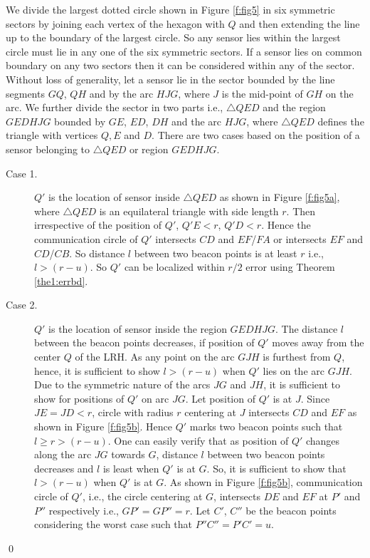 \documentclass[preprint,11pt]{elsarticle}
\newenvironment{proof}{\noindent{\bf Proof: }}{\qed \smallbreak}
\begin{document}
\begin{proof}
We divide the largest dotted circle shown in Figure \ref{f:fig5} in six symmetric sectors by
joining each vertex of the hexagon with $Q$ and then extending the line up to the boundary of the largest circle.
So any sensor lies within the largest circle must lie in any one of the six symmetric sectors. If a sensor lies
on common boundary on any two sectors then it can be considered within any of the sector.
Without loss of generality, let a sensor lie in the sector bounded by the line segments $GQ$, $QH$ and
by the arc $HJG$, where $J$ is the mid-point of $GH$ on the arc. We further divide the sector in two parts i.e., $\triangle QED$ and the region $GEDHJG$ bounded by $GE$, $ED$, $DH$ and the arc $HJG$, where $\triangle QED$ defines the triangle with vertices $Q, E$ and $D$. There are two cases based on the position of a sensor belonging to $\triangle QED$ or region $GEDHJG$.
\begin{description}
  \item[Case 1.] $Q'$ is the location of sensor inside $\triangle QED$ as shown in Figure \ref{f:fig5a}, where $\triangle QED$ is an equilateral triangle with side length $r$. Then irrespective of the position of $Q'$, $Q'E<r$, $Q'D<r$. Hence the communication circle of $Q'$ intersects $CD$ and $EF$/$FA$ or intersects $EF$ and $CD$/$CB$. So distance $l$ between two beacon points is at least $r$ i.e., $l>(r-u)$. So $Q'$ can be localized within $r/2$ error using Theorem \ref{the1:errbd}.
  \item[Case 2.] $Q'$ is the location of sensor inside the region $GEDHJG$. The distance $l$ between the beacon points decreases, if position of $Q'$ moves away from the center $Q$ of the LRH. As any point on the arc $GJH$ is furthest from $Q$, hence, it is sufficient to show $l>(r-u)$ when $Q'$ lies on the arc $GJH$. Due to the symmetric nature of the arcs $JG$ and $JH$, it is sufficient to show for positions of $Q'$ on arc $JG$. Let position of $Q'$ is at $J$. Since $JE=JD<r$, circle with radius $r$ centering at $J$ intersects $CD$ and $EF$ as shown in Figure \ref{f:fig5b}. Hence $Q'$ marks two beacon points such that $l\geq r >(r-u)$.
      One can easily verify that as position of $Q'$ changes along the arc $JG$ towards $G$, distance $l$ between two beacon points decreases and $l$ is least when $Q'$ is at $G$. So, it is sufficient to show that $l>(r-u)$ when $Q'$ is at $G$.
      As shown in Figure \ref{f:fig5b}, communication circle of $Q'$, i.e., the circle centering at $G$, intersects $DE$ and $EF$ at $P'$ and $P''$ respectively i.e., $GP'=GP''=r$. Let $C'$, $C''$ be the beacon points considering the worst case such that $P''C''=P'C'= u$.

\end{description}
\end{proof}
\end{document}
